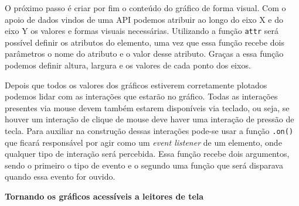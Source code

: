{O próximo passo é criar por fim o conteúdo do gráfico de forma visual. Com o apoio de dados vindos de uma API podemos atribuir ao longo do eixo X e do eixo Y os valores e formas visuais necessárias. Utilizando a função \lstinline{attr} será possível definir os atributos do elemento, uma vez que essa função recebe dois parâmetros o nome do atributo e o valor desse atributo. Graças a essa função podemos definir altura, largura e os valores de cada ponto dos eixos.

Depois que todos os valores dos gráficos estiverem corretamente plotados podemos lidar com as interações que estarão no gráfico. Todas as interações presentes via mouse devem também estarem disponíveis via teclado, ou seja, se houver um interação de clique de mouse deve haver uma interação de pressão de tecla. Para auxiliar na construção dessas interações pode-se usar a função \lstinline{.on()} que ficará responsável por agir como um \textit{event listener} de um elemento, onde qualquer tipo de interação será percebida. Essa função recebe dois argumentos, sendo o primeiro o tipo de evento e o segundo uma função que será disparava quando essa evento for ouvido. 


\textbf{Tornando os gráficos acessíveis a leitores de tela}

}
